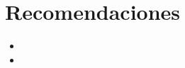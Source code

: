 \chapter{Recomendaciones}
\label{recomendaciones}
\par \lipsum[1-1]

\begin{itemize}
	\item \lipsum[1-1]
	\item \lipsum[2-2]
\end{itemize}